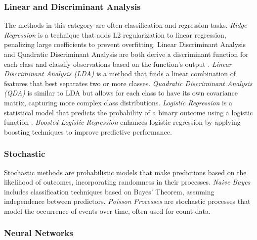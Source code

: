 \documentclass[preprint,12pt]{elsarticle}
\begin{document}
\subsubsection{Linear and Discriminant Analysis}

The methods in this category are often classification and regression tasks. \textit{Ridge Regression} is a technique that adds L2 regularization to linear regression, penalizing large coefficients to prevent overfitting. Linear Discriminant Analysis and Quadratic Discriminant Analysis are both derive a discriminant function for each class and classify observations based on the function's output \cite{tharwat2016linear}. \textit{Linear Discriminant Analysis (LDA)} is a method that finds a linear combination of features that best separates two or more classes. \textit{Quadratic Discriminant Analysis (QDA)} is similar to LDA but allows for each class to have its own covariance matrix, capturing more complex class distributions. \textit{Logistic Regression} is a statistical model that predicts the probability of a binary outcome using a logistic function \cite{hosmer2013applied}. \textit{Boosted Logistic Regression} enhances logistic regression by applying boosting techniques to improve predictive performance.

\subsubsection{Stochastic} 
Stochastic methods are probabilistic models that make predictions based on the likelihood of outcomes, incorporating randomness in their processes. \textit{Naive Bayes} \cite{gladence2015statistical} includes classification techniques based on Bayes' Theorem, assuming independence between predictors. \textit{Poisson Processes} \cite{kingman1992poisson} are stochastic processes that model the occurrence of events over time, often used for count data.

\subsubsection{Neural Networks}
\end{document}
